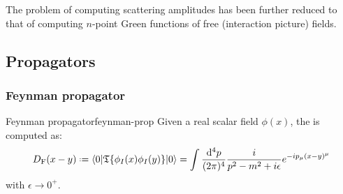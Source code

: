 The problem of computing scattering amplitudes has been further reduced to that of computing $ n $-point Green functions of free (interaction picture) fields.

\subsection{Propagators}

\subsubsection{Feynman propagator}

\begin{theorem}{Feynman propagator}{feynman-prop}
  Given a real scalar field $ \phi(x) $, the  is computed as:
  \begin{equation}
    D_\text{F}(x-y) \defeq \braket{0 | \tempord\{\phi_I(x) \phi_I(y)\} | 0} = \int \frac{\dd^4p}{(2\pi)^4} \frac{i}{p^2 - m^2 + i \epsilon} e^{-i p_\mu (x - y)^\mu}
    \label{eq:feynm-prop}
  \end{equation}
  with $ \epsilon \rightarrow 0^+ $.
\end{theorem}

